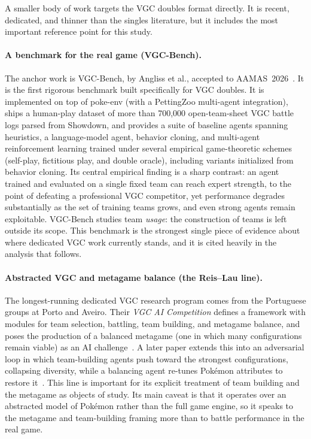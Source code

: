 A smaller body of work targets the VGC doubles format directly. It is recent,
dedicated, and thinner than the singles literature, but it includes the most
important reference point for this study.

\paragraph{A benchmark for the real game (VGC-Bench).}
The anchor work is VGC-Bench, by Angliss et al., accepted to
AAMAS~2026~\cite{angliss2026vgcbench}. It is the first rigorous benchmark built
specifically for VGC doubles. It is implemented on top of poke-env (with a
PettingZoo multi-agent integration), ships a human-play dataset of more than
700{,}000 open-team-sheet VGC battle logs parsed from Showdown, and provides a
suite of baseline agents spanning heuristics, a
language-model agent, behavior cloning, and multi-agent reinforcement learning
trained under several empirical game-theoretic schemes (self-play, fictitious
play, and double oracle), including variants initialized from behavior cloning.
Its central empirical finding is a sharp contrast: an agent trained and evaluated
on a single fixed team can reach expert strength, to the point of defeating a
professional VGC competitor, yet performance degrades substantially as the set of
training teams grows, and even strong agents remain exploitable. VGC-Bench
studies team \emph{usage}: the construction of teams is left outside its scope.
This benchmark is the strongest single piece of evidence about where dedicated
VGC work currently stands, and it is cited heavily in the analysis that follows.

\paragraph{Abstracted VGC and metagame balance (the Reis--Lau line).}
The longest-running dedicated VGC research program comes from the Portuguese
groups at Porto and Aveiro. Their \emph{VGC AI Competition} defines a framework
with modules for team selection, battling, team building, and metagame balance,
and poses the production of a balanced metagame (one in which many configurations
remain viable) as an AI challenge~\cite{reis2021vgccompetition}. A later paper
extends this into an adversarial loop in which team-building agents push toward
the strongest configurations, collapsing diversity, while a balancing agent
re-tunes Pok\'{e}mon attributes to restore it~\cite{reis2023adversarial}. This
line is important for its explicit treatment of team building and the metagame as
objects of study. Its main caveat is that it operates over an abstracted model of
Pok\'{e}mon rather than the full game engine, so it speaks to the metagame and
team-building framing more than to battle performance in the real game.

